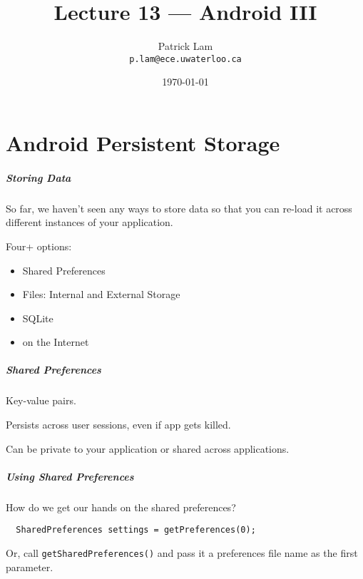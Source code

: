 

\title{Lecture 13 --- Android III}

\author{Patrick Lam \\ \small \texttt{p.lam@ece.uwaterloo.ca}}
\date{\today}




\begin{frame}
  \titlepage
\end{frame}

\part{Android Persistent Storage}

\begin{frame}
\partpage
\end{frame}




\begin{frame}
\frametitle{Storing Data}

\begin{changemargin}{1cm}
So far, we haven't seen any ways to store data so that you can re-load
it across different instances of your application.


Four+ options:
\begin{itemize}
\item Shared Preferences
\item Files: Internal and External Storage
\item SQLite
\item on the Internet
\end{itemize}
\end{changemargin}
\end{frame}

\begin{frame}
\frametitle{Shared Preferences}

\begin{changemargin}{1cm}
Key-value pairs.

Persists across user sessions, even if app gets killed.

Can be private to your application or shared across applications.
\end{changemargin}

\end{frame}


\begin{frame}[fragile]
\frametitle{Using Shared Preferences}
\begin{changemargin}{1cm}

How do we get our
hands on the shared preferences?
\begin{lstlisting}
  SharedPreferences settings = getPreferences(0);
\end{lstlisting}
Or, call {\tt getSharedPreferences()} and pass it a preferences file
name as the first parameter.
\end{changemargin}
\end{frame}

